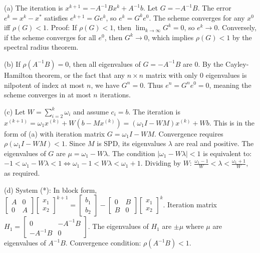 \begin{solution}
(a) The iteration is $x^{k+1} = -A^{-1}Bx^k + A^{-1}b$. Let $G = -A^{-1}B$. The error $e^k = x^k - x^*$ satisfies $e^{k+1} = G e^k$, so $e^k = G^k e^0$. The scheme converges for any $x^0$ iff $\rho(G) < 1$.
Proof: If $\rho(G) < 1$, then $\lim_{k\to\infty} G^k = 0$, so $e^k \to 0$. Conversely, if the scheme converges for all $e^0$, then $G^k \to 0$, which implies $\rho(G) < 1$ by the spectral radius theorem.

(b) If $\rho(A^{-1}B) = 0$, then all eigenvalues of $G = -A^{-1}B$ are 0. By the Cayley-Hamilton theorem, or the fact that any $n \times n$ matrix with only 0 eigenvalues is nilpotent of index at most $n$, we have $G^n = 0$. Thus $e^n = G^n e^0 = 0$, meaning the scheme converges in at most $n$ iterations.

(c) Let $W = \sum_{i=2}^k \omega_i$ and assume $c_i = b$. The iteration is $x^{(k+1)} = \omega_1 x^{(k)} + W(b - Mx^{(k)}) = (\omega_1 I - WM)x^{(k)} + Wb$.
This is in the form of (a) with iteration matrix $G = \omega_1 I - WM$.
Convergence requires $\rho(\omega_1 I - WM) < 1$. Since $M$ is SPD, its eigenvalues $\lambda$ are real and positive. The eigenvalues of $G$ are $\mu = \omega_1 - W\lambda$.
The condition $|\omega_1 - W\lambda| < 1$ is equivalent to:
$-1 < \omega_1 - W\lambda < 1 \iff \omega_1 - 1 < W\lambda < \omega_1 + 1$.
Dividing by $W$: $\frac{\omega_1-1}{W} < \lambda < \frac{\omega_1+1}{W}$, as required.

(d) System (*): In block form, $\begin{bmatrix} A & 0 \\ 0 & A \end{bmatrix} \begin{bmatrix} x_1 \\ x_2 \end{bmatrix}^{k+1} = \begin{bmatrix} b_1 \\ b_2 \end{bmatrix} - \begin{bmatrix} 0 & B \\ B & 0 \end{bmatrix} \begin{bmatrix} x_1 \\ x_2 \end{bmatrix}^k$.
Iteration matrix $H_1 = \begin{bmatrix} 0 & -A^{-1}B \\ -A^{-1}B & 0 \end{bmatrix}$. The eigenvalues of $H_1$ are $\pm \mu$ where $\mu$ are eigenvalues of $A^{-1}B$.
Convergence condition: $\rho(A^{-1}B) < 1$.


\end{solution}
